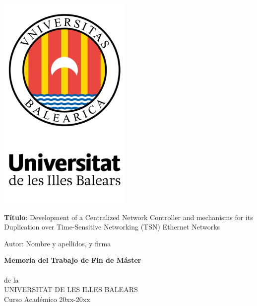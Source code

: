 \onecolumn
\begin{center}


\vspace*{1cm}
\includegraphics[scale=1]{figures/logo.png}

\vspace*{2.2cm}
\LARGE {\textbf{T\'itulo}: Development of a Centralized Network Controller and mechanisms for its Duplication over Time-Sensitive Networking (TSN) Ethernet Networks} \\
\vspace*{1cm}

\noindent \Large{Autor: Nombre y apellidos, y firma\\}
\vspace*{1.5cm}

\noindent \large \textbf{Memoria del Trabajo de Fin de Máster} \\
\vspace*{0.5cm}
 \\
\noindent \large {de la} \\
\noindent \large {UNIVERSITAT DE LES ILLES BALEARS} \\
\vspace*{0.5cm}
\noindent \large {Curso Académico 20xx-20xx} \\
\vspace*{1cm}


\end{center}
